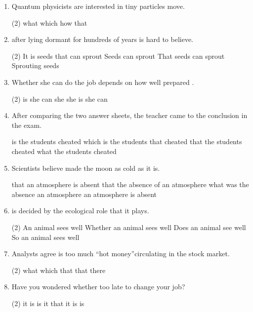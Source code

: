 \begin{enumerate}
\item Quantum physicists are interested in \ttu tiny particles move.
\begin{tasks}(2)
  \task what
  \task which
  \task how
  \task that
\end{tasks}

\item \ttu after lying dormant for hundreds of years is hard to believe.
\begin{tasks}(2)
  \task It is seeds that can sprout
  \task Seeds can sprout
  \task That seeds can sprout
  \task Sprouting seeds
\end{tasks}

\item Whether she can do the job depends on how well prepared \ttu.
\begin{tasks}(2)
  \task is she
  \task can she
  \task she is
  \task she can
\end{tasks}

\item After comparing the two answer sheets, the teacher came to the conclusion \ttu in the exam.
\begin{tasks}
  \task is the students cheated
  \task which is the students that cheated
  \task that the students cheated
  \task what the students cheated
\end{tasks}

\item Scientists believe \ttu made the moon as cold as it is.
\begin{tasks}
  \task that an atmosphere is absent
  \task that the absence of an atmosphere
  \task what was the absence an atmosphere
  \task an atmosphere is absent
\end{tasks}

\item \ttu is decided by the ecological role that it plays.
\begin{tasks}(2)
  \task An animal sees well
  \task Whether an animal sees well
  \task Does an animal see well
  \task So an animal sees well
\end{tasks}

\item Analysts agree \ttu is too much “hot money”circulating in the stock market.
\begin{tasks}(2)
  \task what
  \task which
  \task that
  \task that there
\end{tasks}

\item Have you wondered whether \ttu too late to change your job?
\begin{tasks}(2)
  \task it is
  \task is it
  \task that it is
  \task is
\end{tasks}


\end{enumerate}
